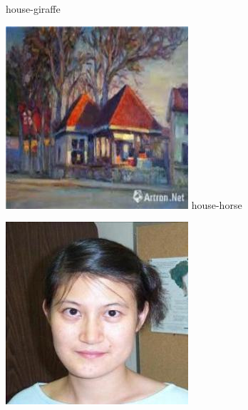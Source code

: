 \documentclass{article}
\begin{document}
\begin{center}
\begin{minipage}{0.142\textwidth}
        house-giraffe
    \end{minipage}%
    \begin{minipage}{0.142\textwidth}
        \includegraphics[width=\linewidth]{./pic/misclassified_r5_p4_2723.jpg}
        house-horse
    \end{minipage}%
    \begin{minipage}{0.142\textwidth}
        \includegraphics[width=\linewidth]{./pic/misclassified_r6_p0_1641.jpg}

\end{minipage}
\end{center}
\end{document}
